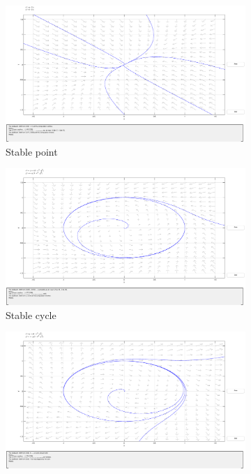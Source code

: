 \begin{figure}[!htb]
  \centering
  \begin{subfigure}[b]{0.45\linewidth}
    \centering
    \includegraphics[trim=116 155 125 55,clip,width=\linewidth]{imgs/stable-point}
    \caption{Stable point}%
    \label{fig:stable-point}
  \end{subfigure}
  \begin{subfigure}[b]{0.45\linewidth}
    \centering
    \includegraphics[trim=116 155 125 55,clip,width=\linewidth]{imgs/stable-cycle}
    \caption{Stable cycle}%
    \label{fig:stable-cycle}
  \end{subfigure}
  \begin{subfigure}[b]{0.5\linewidth}
    \centering
    \includegraphics[trim=116 155 125 55,clip,width=\linewidth]{imgs/semi-stable-cycle}

\end{subfigure}
\end{figure}
